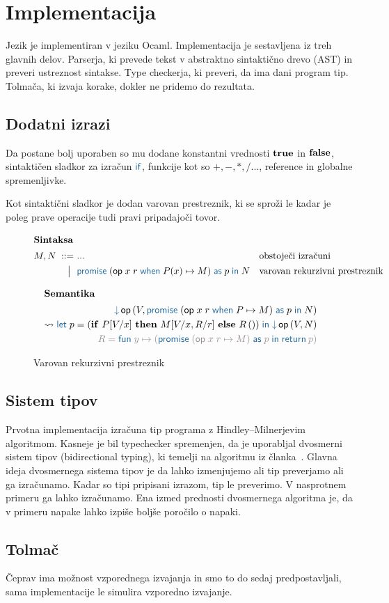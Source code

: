 \section{Implementacija}\label{sec:impl}

Jezik \aeff{} je implementiran v jeziku Ocaml. Implementacija je sestavljena iz treh glavnih delov.
Parserja, ki prevede tekst v abstraktno sintaktično drevo (AST) in preveri ustreznost sintakse.  
Type checkerja, ki preveri, da ima dani program tip.
Tolmača, ki izvaja korake, dokler ne pridemo do rezultata.

\subsection{Dodatni izrazi}

Da \aeff{} postane bolj uporaben so mu dodane konstantni vrednosti $\mathbf{true}$ in $\mathbf{false}$, sintaktičen sladkor za izračun $\tmkw{if}$, funkcije kot so $+, -, *, / ...$, reference in globalne spremenljivke.

Kot sintaktični sladkor je dodan varovan prestreznik, ki se sproži le kadar je poleg prave operacije tudi pravi pripadajoči tovor.
\begin{figure}[h]
	\centering
	\small
	\begin{align*}
	\intertext{\textbf{Sintaksa}}
	M, N
	\bnfis& ...                            & &\text{obstoječi izračuni} \\
	\bnfor& \tmwithrecgu{op}{x}{r}{P(x)}{M}{p}{N}  & &\text{varovan rekurzivni prestreznik}
	\end{align*}
	
	\begin{align*}
	\intertext{\textbf{Semantika}}
	\tmopin{op}{V}{\tmwithrecgu{op}{x}{r}{P}{M}{p}{N}} \\ \reduces \tmlet{p}{(\ite{P[V/x]}{M[V/x, R/r]}{R\,()})}{\tmopin{op}{V}{N}} \\
	{\color{rulenameColor}R = \tmfunano{y}{(\tmwithrec{op}{x}{r}{M}{p}{\tmreturn{p}})}}
	\end{align*}
	
	\caption{Varovan rekurzivni prestreznik}
	\label{fig:izrazi-varovan-prestreznik}
\end{figure}

\subsection{Sistem tipov}\label{sec:tipi}

Prvotna implementacija izračuna tip programa z Hindley–Milnerjevim algoritmom. 
Kasneje je bil typechecker spremenjen, da je uporabljal dvosmerni sistem tipov (bidirectional typing), ki temelji na algoritmu iz članka~\cite{bidirectional}.
Glavna ideja dvosmernega sistema tipov je da lahko izmenjujemo ali tip preverjamo ali ga izračunamo. Kadar so tipi pripisani izrazom, tip le preverimo. V nasprotnem primeru ga lahko izračunamo. Ena izmed prednosti dvosmernega algoritma je, da v primeru napake lahko izpiše boljše poročilo o napaki. 

\subsection{Tolmač}\label{sec:interpreter}

Čeprav ima \aeff{} možnost vzporednega izvajanja in smo to do sedaj predpostavljali, sama implementacije le simulira vzporedno izvajanje.
